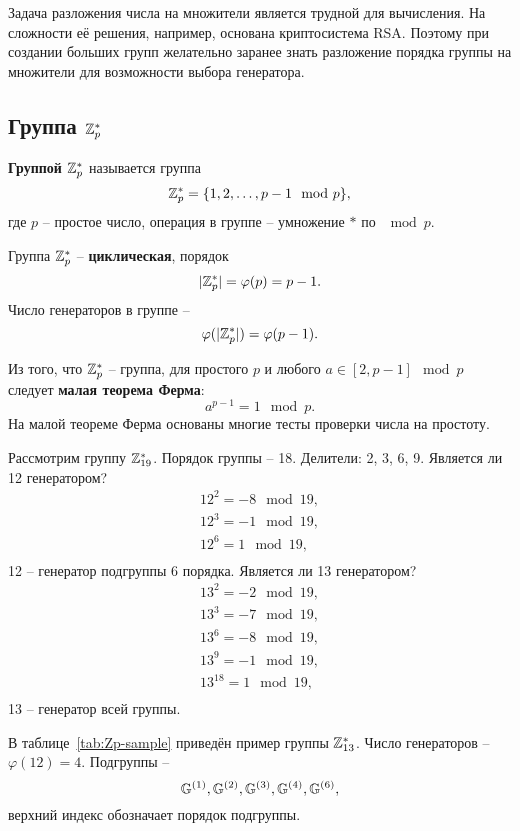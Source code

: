 Задача разложения числа на множители является трудной для вычисления. На сложности её решения, например, основана криптосистема RSA. Поэтому при создании больших групп желательно заранее знать разложение порядка группы на множители для возможности выбора генератора.


\subsection{Группа $\mathbb{Z}_p^*$}\label{section-group-multiplicative}

\textbf{Группой $\mathbb{Z}_p^*$} называется группа
    \[ \mathbb{Z}_p^* = \{1, 2, \dots, p-1 \mod p\}, \]
где $p$ -- простое число, операция в группе -- умножение $\ast$ по $\mod p$.

Группа $\mathbb{Z}_p^*$ -- \textbf{циклическая}, порядок
    \[ |\mathbb{Z}_p^*| = \varphi(p) = p - 1. \]
Число генераторов в группе --
    \[ \varphi(|\mathbb{Z}_p^*|) = \varphi(p-1). \]

Из того, что $\mathbb{Z}_p^*$ -- группа, для простого $p$ и любого $a \in [2, p-1] \mod p$ следует \textbf{малая теорема Ферма}:
    \[ a^{p-1} = 1 \mod p. \]
На малой теореме Ферма основаны многие тесты проверки числа на простоту.

Рассмотрим группу $\mathbb{Z}_{19}^*$. Порядок группы -- 18. Делители: 2, 3, 6, 9. Является ли 12 генератором?
\[ \begin{array}{l}
    12^2 = -8 \mod 19, \\
    12^3 = -1 \mod 19, \\
    12^6 = 1 \mod 19, \\
\end{array} \]
12 -- генератор подгруппы 6 порядка. Является ли 13 генератором?
\[ \begin{array}{l}
    13^2 = -2 \mod 19, \\
    13^3 = -7 \mod 19, \\
    13^6 = -8 \mod 19, \\
    13^9 = -1 \mod 19, \\
    13^{18} = 1 \mod 19, \\
\end{array} \]
13 -- генератор всей группы.
\exampleend

В таблице~\ref{tab:Zp-sample} приведён пример группы $\mathbb{Z}_{13}^*$. Число генераторов -- $\varphi(12) = 4$. Подгруппы --
    \[ \mathbb{G}^{(1)}, \mathbb{G}^{(2)}, \mathbb{G}^{(3)}, \mathbb{G}^{(4)}, \mathbb{G}^{(6)}, \]
верхний индекс обозначает порядок подгруппы.

